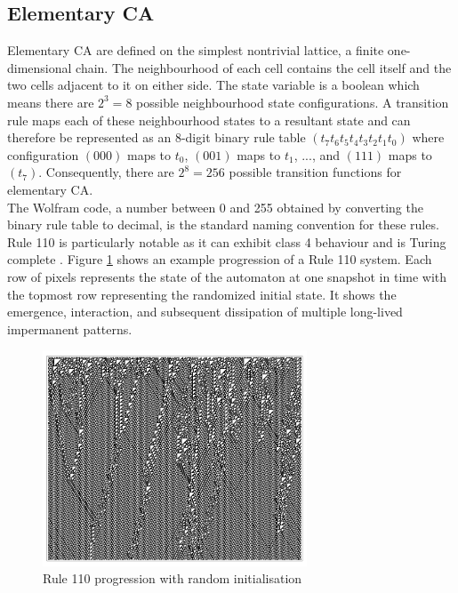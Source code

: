 \subsection{Elementary CA} 
Elementary CA are defined on the simplest nontrivial lattice, a finite one-dimensional chain. The neighbourhood of each cell contains the cell itself and the two cells adjacent to it on either side. The state variable is a boolean which means there are $2^3 = 8$ possible neighbourhood state configurations. A transition rule maps each of these neighbourhood states to a resultant state and can therefore be represented as an 8-digit binary rule table $(t_7t_6t_5t_4t_3t_2t_1t_0)$ where configuration $(000)$ maps to $t_0$, $(001)$ maps to $t_1$, ..., and $(111)$ maps to $(t_7)$. Consequently, there are $2^8=256$ possible transition functions for elementary CA.\\

The Wolfram code, a number between 0 and 255 obtained by converting the binary rule table to decimal, is the standard naming convention for these rules. Rule 110 is particularly notable as it can exhibit class 4 behaviour \cite{wolfram2002} and is Turing complete \cite{cook2004universality}. Figure \ref{fig:rule-110} shows an example progression of a Rule 110 system. Each row of pixels represents the state of the automaton at one snapshot in time with the topmost row representing the randomized initial state. It shows the emergence, interaction, and subsequent dissipation of multiple long-lived impermanent patterns.

\begin{figure}[!h]
\centering
\includegraphics[width=0.7\textwidth]{images/rule-110.png}
\caption{Rule 110 progression with random initialisation \cite{wolfram2002}}
\label{fig:rule-110}
\end{figure}


